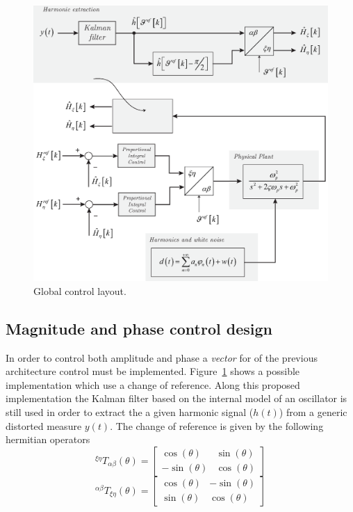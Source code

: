 \documentclass[11pt,a4paper,oneside]{book}
\numberwithin{equation}{section}
\theoremstyle{it}
\theoremstyle{definition}
\begin{document}
\begin{figure}[H]
	\centering
	\includegraphics[width = 400pt, angle = 0, 
	keepaspectratio]{figures/shaker/ctrl_layout_3.eps}
	\captionsetup{width=0.5\textwidth, font=small}		
	\caption{Global control layout.}
	\label{ctrl_layout_3}
\end{figure}
\subsection{Magnitude and phase control design}
In order to control both amplitude and phase a \textit{vector} for of the 
previous architecture control must be implemented. Figure~\ref{ctrl_layout_3} 
shows a possible implementation which use a change of reference. Along this 
proposed implementation the Kalman filter based on the internal model of an 
oscillator is still used in order to extract the a given harmonic signal 
($h(t)$) from a generic distorted measure $y(t)$. 
The change of reference is given by the following hermitian operators
\begin{equation}
	^{\xi\eta}T_{\alpha\beta}(\theta) = \begin{bmatrix} \cos(\theta) & 
		\sin(\theta) \\ -\sin(\theta) & \cos(\theta)	\end{bmatrix}
\end{equation}
\begin{equation}
	^{\alpha\beta}T_{\xi\eta}(\theta) = \begin{bmatrix} \cos(\theta) & 
		-\sin(\theta) \\ \sin(\theta) & \cos(\theta)	\end{bmatrix}
\end{equation}
\end{document}
